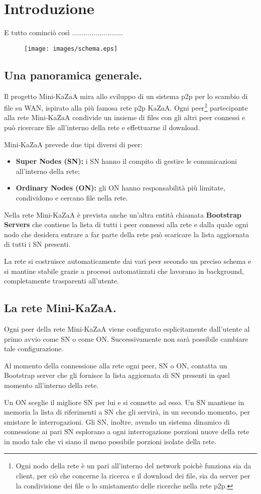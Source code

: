 \chapter{Introduzione}
E tutto cominciò così ..........................
\begin{figure}[h]
 \centering
 \texttt{[image: images/schema.eps]}
 \label{fig:schema}
\end{figure}
\section{Una panoramica generale.}
Il progetto Mini-KaZaA mira allo sviluppo di un sistema p2p per lo scambio di file su WAN, ispirato alla più famosa
rete p2p KaZaA.
Ogni peer\footnote{Ogni nodo della rete è un pari all'interno del network poichè funziona sia da client, per ciò che concerne la ricerca e il download dei file, sia da server per la condivisione dei file o lo smistamento delle ricerche nella rete p2p.} partecipante alla rete Mini-KaZaA condivide un insieme di files con gli altri peer connessi e può ricercare file all'interno della rete e effettuarne il download.

Mini-KaZaA prevede due tipi diversi di peer:
\begin{itemize}
 \item \textbf{Super Nodes (SN): }i SN hanno il compito di gestire le comunicazioni all'interno della rete;
 \item \textbf{Ordinary Nodes (ON): }gli ON hanno responsabilità più limitate, condividono e cercano file nella rete.
\end{itemize}

Nella rete Mini-KaZaA è prevista anche un'altra entità chiamata \textbf{Bootstrap Servers} che contiene la lista di tutti i peer connessi alla rete e dalla quale ogni nodo che desidera entrare a far parte della rete può scaricare la lista aggiornata di tutti i SN presenti.

La rete si costruisce automaticamente dai vari peer secondo un preciso schema e si mantine stabile grazie a processi automatizzati che lavorano in background, completamente trasparenti all'utente.

\section{La rete Mini-KaZaA.}
Ogni peer della rete Mini-KaZaA viene configurato esplicitamente dall'utente al primo avvio come SN o come ON. Successivamente non sarà possibile cambiare tale configurazione.

Al momento della connessione alla rete ogni peer, SN o ON, contatta un Bootstrap server che gli fornisce la lista aggiornata di SN presenti in quel momento all'interno della rete.

Un ON sceglie il migliore SN per lui e si connette ad esso. Un SN mantiene in memoria la lista di riferimenti a SN che gli servirà, in un secondo momento, per smistare le interrogazioni. Gli SN, inoltre, avendo un sistema dinamico di connessione ai pari SN esplorano a ogni interrogazione porzioni nuove della rete in modo tale che vi siano il meno possibile porzioni isolate della rete.
